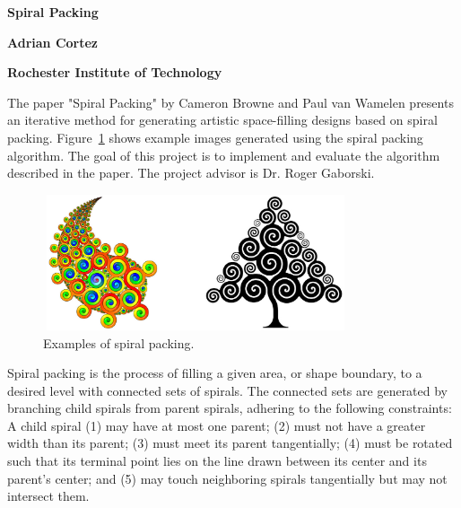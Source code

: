 \documentclass[11pt]{article}
\begin{document}
\begin{center}
    \huge
    \textbf{Spiral Packing}
    
    \vspace{0.1cm}
    \Large
    \textbf{Adrian Cortez}
    
    \vspace{0.1cm}
    \small
    \textbf{Rochester Institute of Technology}
    \vspace{0.3cm}
\end{center}

	The paper "Spiral Packing" by Cameron Browne and Paul van Wamelen \cite{Browne2006834} presents an iterative method for generating artistic space-filling designs based on spiral packing. Figure~\ref{fig:example} shows example images generated using the spiral packing algorithm. The goal of this project is to implement and evaluate the algorithm described in the paper. The project advisor is Dr. Roger Gaborski.
	
\begin{figure}[ht]
	\centering
	\includegraphics[width=90mm,height=40mm]{spiral-packing-example}
	\caption{Examples of spiral packing. \cite{Browne2006834}}
	\label{fig:example}
\end{figure}

	Spiral packing is the process of filling a given area, or shape boundary, to a desired level with connected sets of spirals. The connected sets are generated by branching child spirals from parent spirals, adhering to the following constraints: A child spiral (1) may have at most one parent; (2) must not have a greater width than its parent; (3) must meet its parent tangentially; (4) must be rotated such that its terminal point lies on the line drawn between its center and its parent's center; and (5) may touch neighboring spirals tangentially but may not intersect them. 
	
\end{document}
